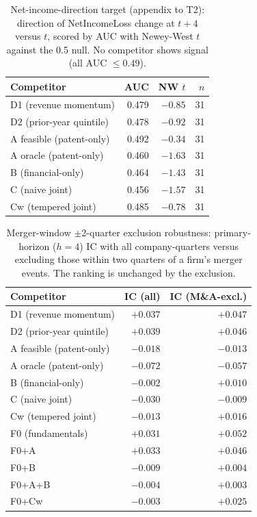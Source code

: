 \documentclass[11pt]{article}
\begin{document}
\begin{table}[htbp]
  \centering
  \caption{Net-income-direction target (appendix to T2): direction of NetIncomeLoss change at $t+4$ versus $t$, scored by AUC with Newey-West $t$ against the 0.5 null. No competitor shows signal (all AUC $\leq 0.49$).}
  \label{tab:nidir}
  \begin{tabular}{lrrr}
    \toprule
    Competitor & AUC & NW $t$ & $n$ \\
    \midrule
    D1 (revenue momentum) & 0.479 & $-0.85$ & 31 \\
    D2 (prior-year quintile) & 0.478 & $-0.92$ & 31 \\
    A feasible (patent-only) & 0.492 & $-0.34$ & 31 \\
    A oracle (patent-only) & 0.460 & $-1.63$ & 31 \\
    B (financial-only) & 0.464 & $-1.43$ & 31 \\
    C (naive joint) & 0.456 & $-1.57$ & 31 \\
    Cw (tempered joint) & 0.485 & $-0.78$ & 31 \\
    \bottomrule
  \end{tabular}
\end{table}

\begin{table}[htbp]
  \centering
  \caption{Merger-window $\pm$2-quarter exclusion robustness: primary-horizon ($h=4$) IC with all company-quarters versus excluding those within two quarters of a firm's merger events. The ranking is unchanged by the exclusion.}
  \label{tab:maexcl}
  \begin{tabular}{lrr}
    \toprule
    Competitor & IC (all) & IC (M\&A-excl.) \\
    \midrule
    D1 (revenue momentum) & $+0.037$ & $+0.047$ \\
    D2 (prior-year quintile) & $+0.039$ & $+0.046$ \\
    A feasible (patent-only) & $-0.018$ & $-0.013$ \\
    A oracle (patent-only) & $-0.072$ & $-0.057$ \\
    B (financial-only) & $-0.002$ & $+0.010$ \\
    C (naive joint) & $-0.030$ & $-0.009$ \\
    Cw (tempered joint) & $-0.013$ & $+0.016$ \\
    \midrule
    F0 (fundamentals) & $+0.031$ & $+0.052$ \\
    F0+A & $+0.033$ & $+0.046$ \\
    F0+B & $-0.009$ & $+0.004$ \\
    F0+A+B & $-0.004$ & $+0.003$ \\
    F0+Cw & $-0.003$ & $+0.025$ \\
    \bottomrule
  \end{tabular}
\end{table}
\end{document}
